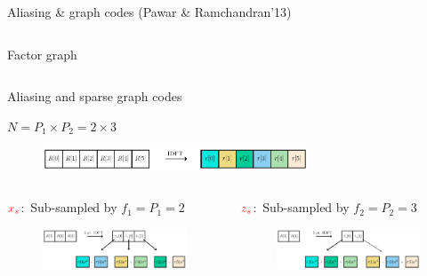 \documentclass[10pt,xcolor=table]{beamer}
\begin{document}
\begin{frame}{Aliasing \& graph codes (Pawar \& Ramchandran'13)}
\begin{columns}
			\begin{block}{\small Factor graph}
				\begin{figure}[t]
					\begin{center}
						\resizebox{1.0\textwidth}{!}{}
					\end{center}
				\end{figure}

			\end{block}
		\end{columns}
	\end{frame}
	\begin{frame}{Aliasing and sparse graph codes}
	
	\begin{block}{$N = P_1 \times P_2 = 2 \times 3$}
		\begin{figure}[t]
			\centering
			\includegraphics[width=3.1in]{X_DFT}
		\end{figure}
	\end{block}
	
	\begin{columns}
		
		\begin{block}{{\small $\color{red}x_s$:\ Sub-sampled by $f_1=P_1=2$}}
			\begin{figure}[t]
				\centering
				\includegraphics[width=2.3in]{Xs_shift}
			\end{figure}
		\end{block}
		
		\begin{block}{{\small$\color{red}z_s$:\ Sub-sampled by $f_2=P_2=3$}}
			\begin{figure}[t]
				\centering
				\includegraphics[width=2.3in]{Zs_shift}
			\end{figure}
		\end{block}
		

\end{columns}
\end{frame}
\end{document}
